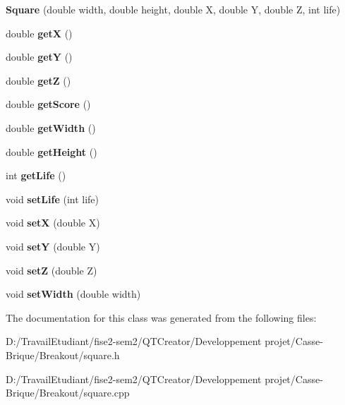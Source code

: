 \begin{DoxyCompactItemize}
\item 
\mbox{\label{class_square_a27551dfdcf961cba100f79bc3441ead3}} 
{\bfseries Square} (double width, double height, double X, double Y, double Z, int life)
\item 
\mbox{\label{class_square_abca130ad5c32ded493bc56851de84974}} 
double {\bfseries getX} ()
\item 
\mbox{\label{class_square_a466213e529d0623f27dd59baa5fd425c}} 
double {\bfseries getY} ()
\item 
\mbox{\label{class_square_add85982817300e975f00d982c2944fd3}} 
double {\bfseries getZ} ()
\item 
\mbox{\label{class_square_a5a52ced157d32d3fe038c3674dc7c975}} 
double {\bfseries get\+Score} ()
\item 
\mbox{\label{class_square_a3e8803173f2c9c75df15689760a7db68}} 
double {\bfseries get\+Width} ()
\item 
\mbox{\label{class_square_a2759b76cb77ad8310d37e5f8464f6d0f}} 
double {\bfseries get\+Height} ()
\item 
\mbox{\label{class_square_a8a9dc441b3a1108c52024d5adf25fa80}} 
int {\bfseries get\+Life} ()
\item 
\mbox{\label{class_square_a115fdac881e80628eca323b22d5a0280}} 
void {\bfseries set\+Life} (int life)
\item 
\mbox{\label{class_square_a9c14b2ee20078f70e313c1cb62965106}} 
void {\bfseries setX} (double X)
\item 
\mbox{\label{class_square_a9346b7fc5a92f4ffce92e59d3d9b22b8}} 
void {\bfseries setY} (double Y)
\item 
\mbox{\label{class_square_aa54150595cc276766eab4e251dafd33e}} 
void {\bfseries setZ} (double Z)
\item 
\mbox{\label{class_square_ad1d24f2813f78e5052d8085473d222b9}} 
void {\bfseries set\+Width} (double width)
\end{DoxyCompactItemize}


The documentation for this class was generated from the following files\+:\begin{DoxyCompactItemize}
\item 
D\+:/\+Travail\+Etudiant/fise2-\/sem2/\+Q\+T\+Creator/\+Developpement projet/\+Casse-\/\+Brique/\+Breakout/square.\+h\item 
D\+:/\+Travail\+Etudiant/fise2-\/sem2/\+Q\+T\+Creator/\+Developpement projet/\+Casse-\/\+Brique/\+Breakout/square.\+cpp\end{DoxyCompactItemize}

